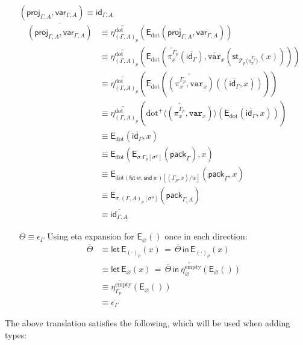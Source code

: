 \documentclass[10pt]{article}
\theoremstyle{definition}
\let\emptyset\varnothing
\newcommand\dsd[1]{\ensuremath{\mathsf{#1}}}
\newcommand{\app}[2]{\ensuremath{#1 \: #2}}
\newcommand{\fst}[1]{\app{\dsd{fst}}{#1}}
\newcommand{\snd}[1]{\app{\dsd{snd}}{#1}}
\newcommand{\id}{\mathsf{id}}
\newcommand{\rewrite}[2]{\overleftarrow{#1}(#2)}
\newcommand\E[2]{\ensuremath{\mathsf{E}_{#1}(#2)}}
\newcommand\StI[2]{\ensuremath{\mathsf{st}_{#1}(#2)}}
\newcommand\EEs[4]{\ensuremath{\mathsf{let} \, \mathsf{E}_{#1}(#3) \, = \, {#2} \, \mathsf{in} \, #4}}
\newcommand\EIs[2]{\ensuremath{\mathsf{E}_{#1}{(#2)}}}
\newcommand\ApEl[2]{\mathcal{T}_{#1}\langle#2\rangle}
\newcommand\ApPlus[2]{\ensuremath{{#1}^+ \langle #2 \rangle }}
\newcommand\pack[1]{\ensuremath{\mathsf{pack}_{#1}}}
\newcommand\unp[2]{\ensuremath{{#2}^u}}
\newcommand{\modeof}[1]{{#1}_p}
\newcommand{\sdot}{\ensuremath{\mathrm{dot}}}
\newcommand{\sempty}{\ensuremath{\mathrm{empty}}}
\newcommand{\upstairs}[1]{\overline{#1}}
\newcommand{\downstairs}[1]{\underline{#1}}
\newcommand\proj[1]{\ensuremath{\mathsf{proj}_{#1}}}
\newcommand\qvar[1]{\ensuremath{\mathsf{var}_{#1}}}
\newcommand\var[1]{\ensuremath{\mathtt{var}_{#1}}}
\begin{document}
\begin{enumerate}[style = multiline, labelwidth = 80pt]
\item[{$(\proj{\Gamma,A}, \qvar{\Gamma,A}) \equiv \id_{\Gamma, A}$}] 
\begin{align*}
\upstairs{(\proj{\Gamma,A}, \qvar{\Gamma,A})}
&\equiv \rewrite{\eta^\sdot_{\modeof{(\Gamma, A)}}}{\EIs{\sdot}{\upstairs{\proj{\Gamma,A}}, \upstairs{\qvar{\Gamma,A}}}} \\
&\equiv \rewrite{\eta^\sdot_{\modeof{(\Gamma, A)}}}{\EIs{\sdot}{\rewrite{\pi^{\modeof{\Gamma}}_x}{\upstairs{\id_\Gamma}}, \rewrite{\var{x}}{\StI{\ApEl{p}{\pi^{\modeof{\Gamma}}_x}}{x}}}} \\
&\equiv \rewrite{\eta^\sdot_{\modeof{(\Gamma, A)}}}{\EIs{\sdot}{\rewrite{(\pi^{\modeof{\Gamma}}_x, \var{x})}{(\upstairs{\id_\Gamma}, x)}}}\\
&\equiv \rewrite{\eta^\sdot_{\modeof{(\Gamma, A)}}}{\rewrite{\ApPlus{\sdot}{(\pi^{\modeof{\Gamma}}_x, \var{x})}}{\EIs{\sdot}{\upstairs{\id_\Gamma}, x}}}\\
&\equiv \EIs{\sdot}{\upstairs{\id_\Gamma}, x} \\
&\equiv \EIs{\sdot}{\EIs{\sigma.\modeof{\Gamma}[\unp{\Gamma}{\sigma}]}{\pack{\downstairs{\Gamma}}}, x}\\
&\equiv \EIs{\sdot(\fst w, \snd w)[(\modeof{\Gamma}, x)/w]}{\pack{\downstairs{\Gamma}}, x} \\
&\equiv \EIs{\sigma.\modeof{(\Gamma, A)}[\unp{\Gamma, A}{\sigma}]}{\pack{\downstairs{\Gamma, A}}} \\
&\equiv \upstairs{\id_{\Gamma, A}}
\end{align*}

\item[$\Theta \equiv \epsilon_\Gamma$] 
Using eta expansion for $\E{\emptyset}{}$ once in each direction:
\begin{align*}
\upstairs{\Theta}
&\equiv \EEs{\modeof{(\cdot)}}{\upstairs{\Theta}}{x}{\EIs{\modeof{(\cdot)}}{x}} \\
&\equiv \EEs{\emptyset}{\upstairs{\Theta}}{x}{\rewrite{\eta^\sempty_{\emptyset}}{\EIs{\emptyset}{}}} \\
&\equiv \rewrite{\eta^\sempty_{\modeof{\Gamma}}}{\EIs{\emptyset}{}} \\
&\equiv \upstairs{\epsilon_\Gamma}
\end{align*}
\end{enumerate}

The above translation satisfies the following, which will be used when
adding types:
\end{document}
